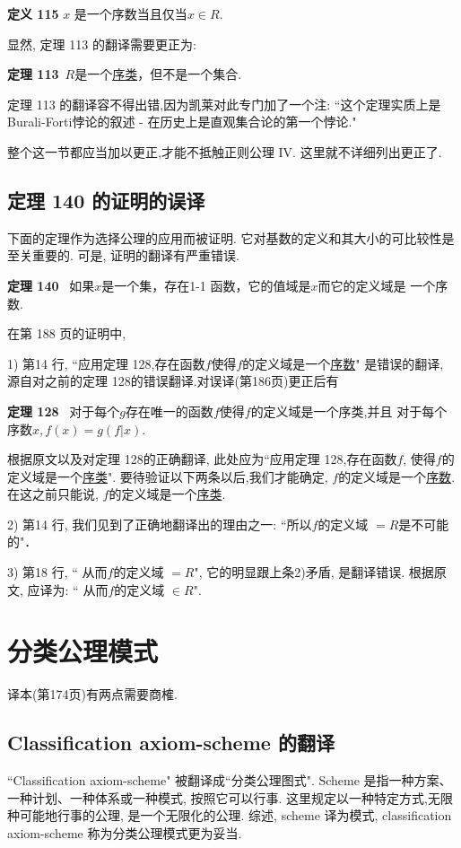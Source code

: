 \documentclass[zihao=-4,a4paper]{ctexart}
\begin{document}
{\bf 定义 115}
{\kaishu
$x$ 是一个序数当且仅当$x\in R$.
}

\noindent 显然, 定理 113 的翻译需要更正为:

{\bf 定理 113}\, 
{\kaishu
	$R$是一个\underline{序类}，但不是一个集合.
}

\noindent
定理 113 的翻译容不得出错,因为凯莱对此专门加了一个注: 
“这个定理实质上是 Burali-Forti悖论的叙述
- 在历史上是直观集合论的第一个悖论."

整个这一节都应当加以更正,才能不抵触正则公理 IV. 这里就不详细列出更正了.

\subsection{定理 140 的证明的误译}
下面的定理作为选择公理的应用而被证明. 它对基数的定义和其大小的可比较性是至关重要的. 可是, 证明的翻译有严重错误.

{\bf 定理 140} \,  
{\kaishu
如果$x$是一个集，存在1-1 函数，它的值域是$x$而它的定义域是
一个序数.
}

在\cite{jkelley2010zh}第 188 页的证明中, 

1) 第14 行, “应用定理 128,存在函数$f$使得$f$的定义域是一个\underline{序数}" 
是错误的翻译, 源自对之前的定理 128的错误翻译.对误译(\cite{jkelley2010zh}第186页)更正后有

{\bf 定理 128} \,
{\kaishu
对于每个$g$存在唯一的函数$f$使得$f$的定义域是一个序类,并且
对于每个序数$x, f(x) = g(f\vert x)$.
}

根据原文以及对定理 128的正确翻译,
此处应为“应用定理 128,存在函数$f$, 使得$f$的定义域是一个\underline{序类}". 要待验证以下两条以后,我们才能确定, $f$的定义域是一个\underline{序数}.在这之前只能说, 
$f$的定义域是一个\underline{序类}.

2) 第14 行,  我们见到了正确地翻译出的理由之一: “所以$f$的定义域
$=R$是不可能的"．

3) 第18 行,  “ 从而$f$的定义域 $=R$", 它的明显跟上条2)矛盾, 是翻译错误. 根据原文, 
应译为: “ 从而$f$的定义域 $\in R$".


\section{分类公理模式 }	
译本(\cite{jkelley2010zh}第174页)有两点需要商榷.
\subsection{Classification axiom-scheme 的翻译}
“Classification axiom-scheme" 被翻译成“分类公理图式". Scheme  是指一种方案、一种计划、一种体系或一种模式, 按照它可以行事. 这里规定以一种特定方式,无限种可能地行事的公理, 是一个无限化的公理. 
综述, scheme 译为模式, classification axiom-scheme 称为分类公理模式更为妥当.
\end{document}
